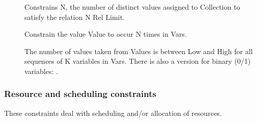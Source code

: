 \begin{description}
\item[]
Constrains N, the number of distinct values assigned to 
Collection to satisfy the relation N Rel Limit.

\item[]
Constrain the value Value to occur N times in Vars.

\item[]
The number of values taken from Values is between Low and
High for all sequences of K variables in Vars. There is also a version for
binary (0/1) variables:
.
\end{description}

\subsubsection{Resource and scheduling constraints}
These constraints deal with scheduling and/or allocation of resources.

